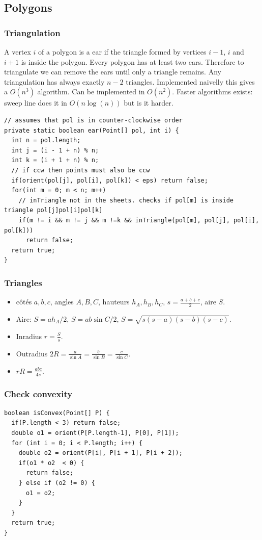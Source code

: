 \subsection{Polygons}
\subsubsection{Triangulation}
A vertex $i$ of a polygon is a ear if the triangle formed by vertices
$i - 1$, $i$ and $i + 1$ is inside the polygon. Every polygon has at
least two ears. Therefore to triangulate we can remove the ears 
until only a triangle remains. Any triangulation has always exactly 
$n - 2$ triangles. Implemented naivelly this gives a $O(n^3)$ algorithm.
Can be implemented in $O(n^2)$. Faster algorithms exists: 
sweep line does it in $O(n \log(n))$ but is it harder.
\begin{lstlisting}
// assumes that pol is in counter-clockwise order
private static boolean ear(Point[] pol, int i) {
  int n = pol.length;
  int j = (i - 1 + n) % n;
  int k = (i + 1 + n) % n;
  // if ccw then points must also be ccw
  if(orient(pol[j], pol[i], pol[k]) < eps) return false;
  for(int m = 0; m < n; m++)
    // inTriangle not in the sheets. checks if pol[m] is inside triangle pol[j]pol[i]pol[k]
    if(m != i && m != j && m !=k && inTriangle(pol[m], pol[j], pol[i], pol[k]))
      return false;
  return true;
}
\end{lstlisting}

\subsubsection{Triangles}
\begin{itemize}
  \item côtés $a,b,c$, angles $A,B,C$, hauteurs $h_A,h_B,h_C$, $s=\frac{a+b+c}{2}$, aire $S$.
  \item Aire: $S=ah_A/2$, $S=ab\sin C/2$, $S=\sqrt{s(s-a)(s-b)(s-c)}$.
  \item Inradius $r=\frac{S}{s}$.
  \item Outradius $2R = \frac{a}{\sin A} = \frac{b}{\sin B} = \frac{c}{\sin C}$.
  \item $rR = \frac{abc}{4s}$.
\end{itemize}
\subsubsection{Check convexity}
\begin{lstlisting}
boolean isConvex(Point[] P) {
  if(P.length < 3) return false;
  double o1 = orient(P[P.length-1], P[0], P[1]);
  for (int i = 0; i < P.length; i++) {
    double o2 = orient(P[i], P[i + 1], P[i + 2]);
    if(o1 * o2  < 0) {
      return false;
    } else if (o2 != 0) {
      o1 = o2;
    }
  }
  return true;
}
\end{lstlisting}
